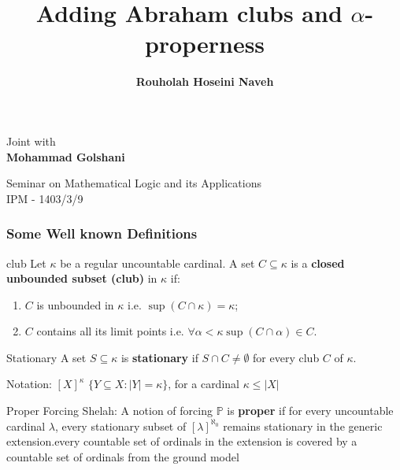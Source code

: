 \documentclass{beamer}
\begin{document}
\title{\textbf{Adding  Abraham clubs and  $\alpha$-properness}}

\author{\textbf{Rouholah Hoseini Naveh}}
\begin{frame}
\date{}
\maketitle
\vspace{-2.7cm}
\begin{center}
Joint with\\
\textbf{Mohammad Golshani}
\end{center}
\vspace{1cm}
\begin{center}
Seminar on Mathematical Logic and its Applications\\
IPM - 1403/3/9
\end{center}
\end{frame}
\begin{frame}
\frametitle{Some Well known Definitions}
\begin{block}{club}
Let $\kappa$ be a regular uncountable cardinal. A set $C\subseteq \kappa$ is a \textbf{closed unbounded subset (club)} in $\kappa$ if: \pause
\begin{enumerate}
\item
$C$ is unbounded in $\kappa$ \pause i.e. $\sup(C \cap \kappa)=\kappa$; \pause
\item 
$C$ contains all its limit points \pause i.e. $\forall \alpha<\kappa \sup(C \cap \alpha)\in C$.
\end{enumerate}
\end{block}
\pause
\begin{block}{Stationary}
A set $S \subseteq \kappa$ is \textbf{stationary} if $S \cap C \neq \emptyset$ for every club $C$ of $\kappa$.
\end{block}
\pause
\begin{block}{Notation: $[X]^{\kappa}$}
$\lbrace Y\subseteq X \colon |Y|=\kappa \rbrace$, for a cardinal $\kappa \leq |X|$
\end{block}
\pause
\begin{block}{Proper Forcing}
Shelah: A notion of forcing $\mathds{P}$ is \textbf{proper} if for every uncountable cardinal $\lambda$, every stationary subset of $[\lambda]^{\aleph_0}$ remains stationary in the generic extension.every countable set of ordinals in the extension is covered by a countable set of ordinals from the ground model
\end{block}
\end{frame}
\end{document}
